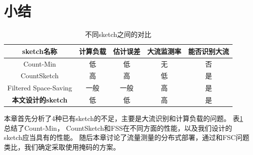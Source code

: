 
\section{小结}

\begin{table}[ht]
	\centering
	\caption{不同sketch之间的对比}\label{tbl:sketchcompare}
	\begin{tabular}{c|c|c|c|c}
		\hline
		sketch名称 & 计算负载 &估计误差&大流监测率& 能否识别大流 \\
		\hline
		Count-Min\cite{cormode2004improved} & 低 &低& 无 &否\\
		\hline
		CountSketch\cite{charikar2004finding} & 高 &高 &低&是\\
		\hline
		Filtered Space-Saving\cite{homem2010finding}  & 一般 & 一般&高& 是\\
		\hline
		\textbf{本文设计的sketch} & 低 &低 &高&是\\
		\hline		
	\end{tabular}
\end{table}

本章首先分析了4种已有sketch的不足，主要是大流识别和计算负载的问题。
表\ref{tbl:sketchcompare}总结了Count-Min， CountSketch和FSS在不同方面的性能，以及我们设计的sketch应当具有的性能。
随后本章讨论了流量测量的分布式部署，通过和FSC问题类比，我们确定采取使用掩码的方案。
